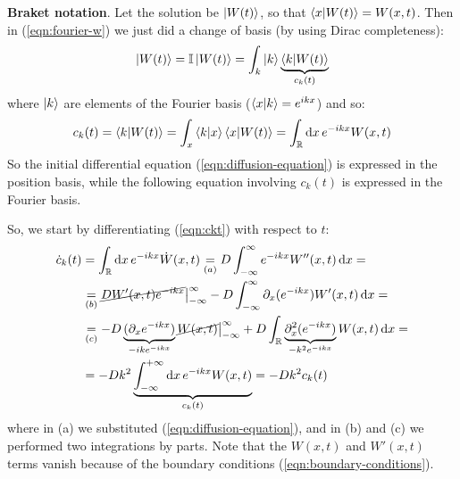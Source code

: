 \documentclass[../template.tex]{subfiles}
\begin{document}
\begin{expl}
    \textbf{Braket notation}. Let the solution be $\ket{W(t)}$, so that $\braket{x}{W(t)} = W(x,t)$. Then in (\ref{eqn:fourier-w}) we just did a change of basis (by using Dirac completeness):
    \begin{align*}
        \ket{W(t)} = \mathbb{I} \ket{W(t)} = \int_k \ket{k}\underbrace{\braket{k}{W(t)}}_{c_k(t)} 
    \end{align*}
    where $\ket{k}$ are elements of the Fourier basis ($\braket{x}{k} = e^{ikx}$) and so:
    \begin{align*}
        c_k(t) = \braket{k}{W(t)} = \int_x \braket{k}{x} \braket{x}{W(t)} = \int_{\mathbb{R}} \dd{x} e^{-ikx} W(x,t)
    \end{align*}
    So the initial differential equation (\ref{eqn:diffusion-equation}) is expressed in the position basis, while the following equation involving $c_k(t)$ is expressed in the Fourier basis. 
\end{expl}
So, we start by differentiating (\ref{eqn:ckt}) with respect to $t$:
\begin{align*}
    \dot{c}_k(t) &= \int_{\mathbb{R}} \dd{x} e^{-ikx} \dot{W}(x,t) \underset{(a)}{=}  D \int_{-\infty}^{\infty} e^{-ikx} W''(x,t) \dd{x} =  \\
    &\underset{(b)}{=}  \cancel{D W'(x,t) e^{-ikx}}\big|_{-\infty}^{\infty} - D \int_{-\infty}^{\infty} \partial_x (e^{-ikx}) W'(x,t) \dd{x} = \\
    &\underset{(c)}{=}  -D\underbrace{(\partial_x e^{-ikx})}_{-ik e^{-ikx}} \cancel{W(x,t) }\big|_{-\infty}^{\infty} + D\int_{\mathbb{R}} \underbrace{\partial_x^2 (e^{-ikx})}_{-k^2 e^{-ikx}} W(x,t) \dd{x} =\\
    &= -Dk^2 \underbrace{\int_{-\infty}^{+\infty} \dd{x} e^{-ikx} W(x,t)}_{c_k(t)} = -Dk^2 c_k(t)  \\
\end{align*} 
where in (a) we substituted (\ref{eqn:diffusion-equation}), and in (b) and (c) we performed two integrations by parts. Note that the $W(x,t)$ and $W'(x,t)$ terms vanish because of the boundary conditions (\ref{eqn:boundary-conditions}).  
\end{document}
